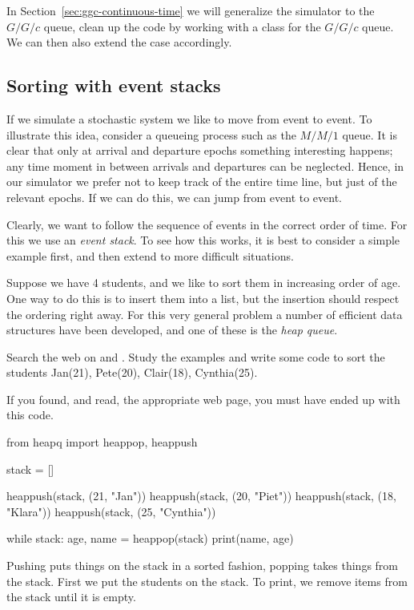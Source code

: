 In Section~\ref{sec:ggc-continuous-time} we will generalize the simulator to the $G/G/c$ queue, clean up the code by working with a class for the $G/G/c$ queue. We can then also extend the case accordingly. 


\subsection{Sorting with event stacks}
\label{sec:event-stacks}

If we simulate a stochastic system we like to move from event to event.
To illustrate this idea, consider a queueing process such as the $M/M/1$ queue.
It is clear that only at arrival and departure epochs something interesting happens; any time moment in between arrivals and departures can be neglected.
Hence, in our simulator we prefer not to keep track of the entire time line, but just of the relevant epochs.
If we can do this, we can jump from event to event.

Clearly, we want to follow the sequence of events in the correct order of time.
For this we use an \emph{event stack}.
To see how this works, it is best to consider a simple example first, and then extend to more difficult situations.

Suppose we have 4 students, and we like to sort them in increasing order of age.
One way to do this is to insert them into a list, but the insertion should respect the ordering right away.
For this very general problem a number of efficient data structures have been developed, and one of these is the \emph{heap queue}.

\begin{exercise}
  Search the web on  and . Study the examples and write some code to sort the students Jan(21), Pete(20), Clair(18), Cynthia(25).

  \begin{solution}
If you found, and read, the appropriate web page, you must have ended up with this code.
\begin{pyblock}
from heapq import heappop, heappush

stack = []

heappush(stack, (21, "Jan"))
heappush(stack, (20, "Piet"))
heappush(stack, (18, "Klara"))
heappush(stack, (25, "Cynthia"))

while stack:
    age, name = heappop(stack)
    print(name, age)

  \end{pyblock}

Pushing puts things on the stack in a sorted fashion, popping takes things from the stack. First we put the students on the stack. To print, we remove items from the stack until it is empty.
\end{solution}
  
\end{exercise}



